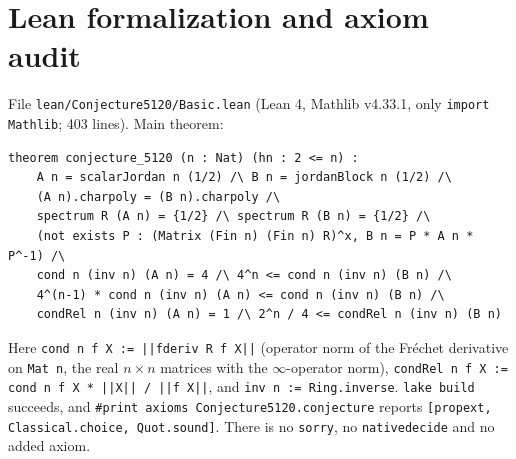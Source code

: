 \documentclass[11pt]{article}
\renewcommand{\_}{\oldus\allowbreak}
\theoremstyle{remark}
\begin{document}
\section{Lean formalization and axiom audit}
File \texttt{lean/Conjecture5120/Basic.lean} (Lean 4, Mathlib v4.33.1, only
\texttt{import Mathlib}; 403 lines). Main theorem:
\begin{verbatim}
theorem conjecture_5120 (n : Nat) (hn : 2 <= n) :
    A n = scalarJordan n (1/2) /\ B n = jordanBlock n (1/2) /\
    (A n).charpoly = (B n).charpoly /\
    spectrum R (A n) = {1/2} /\ spectrum R (B n) = {1/2} /\
    (not exists P : (Matrix (Fin n) (Fin n) R)^x, B n = P * A n * P^-1) /\
    cond n (inv n) (A n) = 4 /\ 4^n <= cond n (inv n) (B n) /\
    4^(n-1) * cond n (inv n) (A n) <= cond n (inv n) (B n) /\
    condRel n (inv n) (A n) = 1 /\ 2^n / 4 <= condRel n (inv n) (B n)
\end{verbatim}
Here \texttt{cond n f X := ||fderiv R f X||} (operator norm of the Fr\'echet derivative on
\texttt{Mat n}, the real $n\times n$ matrices with the $\infty$-operator norm),
\texttt{condRel n f X := cond n f X * ||X|| / ||f X||}, and \texttt{inv n := Ring.inverse}.
\texttt{lake build} succeeds, and \texttt{\#print axioms Conjecture5120.conjecture\_5120} reports
\texttt{[propext, Classical.choice, Quot.sound]}. There is no \texttt{sorry}, no
\texttt{native\_decide} and no added axiom.
\end{document}

